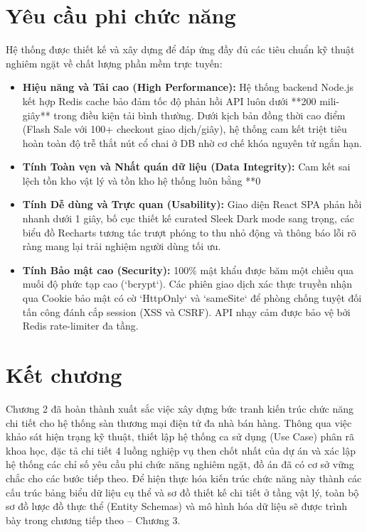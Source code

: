 \documentclass[../DoAn.tex]{subfiles}
\begin{document}
\section{Yêu cầu phi chức năng}
\label{section:2.4}
Hệ thống được thiết kế và xây dựng để đáp ứng đầy đủ các tiêu chuẩn kỹ thuật nghiêm ngặt về chất lượng phần mềm trực tuyến:
\begin{itemize}
\item \textbf{Hiệu năng và Tải cao (High Performance):} Hệ thống backend Node.js kết hợp Redis cache bảo đảm tốc độ phản hồi API luôn dưới **200 mili-giây** trong điều kiện tải bình thường. Dưới kịch bản đồng thời cao điểm (Flash Sale với 100+ checkout giao dịch/giây), hệ thống cam kết triệt tiêu hoàn toàn độ trễ thắt nút cổ chai ở DB nhờ cơ chế khóa nguyên tử ngắn hạn.
\item \textbf{Tính Toàn vẹn và Nhất quán dữ liệu (Data Integrity):} Cam kết sai lệch tồn kho vật lý và tồn kho hệ thống luôn bằng **0%
\item \textbf{Tính Dễ dùng và Trực quan (Usability):} Giao diện React SPA phản hồi nhanh dưới 1 giây, bố cục thiết kế curated Sleek Dark mode sang trọng, các biểu đồ Recharts tương tác trượt phóng to thu nhỏ động và thông báo lỗi rõ ràng mang lại trải nghiệm người dùng tối ưu.
\item \textbf{Tính Bảo mật cao (Security):} 100\% mật khẩu được băm một chiều qua muối độ phức tạp cao (`bcrypt`). Các phiên giao dịch xác thực truyền nhận qua Cookie bảo mật có cờ `HttpOnly` và `sameSite` để phòng chống tuyệt đối tấn công đánh cắp session (XSS và CSRF). API nhạy cảm được bảo vệ bởi Redis rate-limiter đa tầng.
\end{itemize}

\section*{Kết chương}
Chương 2 đã hoàn thành xuất sắc việc xây dựng bức tranh kiến trúc chức năng chi tiết cho hệ thống sàn thương mại điện tử đa nhà bán hàng. Thông qua việc khảo sát hiện trạng kỹ thuật, thiết lập hệ thống ca sử dụng (Use Case) phân rã khoa học, đặc tả chi tiết 4 luồng nghiệp vụ then chốt nhất của dự án và xác lập hệ thống các chỉ số yêu cầu phi chức năng nghiêm ngặt, đồ án đã có cơ sở vững chắc cho các bước tiếp theo. Để hiện thực hóa kiến trúc chức năng này thành các cấu trúc bảng biểu dữ liệu cụ thể và sơ đồ thiết kế chi tiết ở tầng vật lý, toàn bộ sơ đồ lược đồ thực thể (Entity Schemas) và mô hình hóa dữ liệu sẽ được trình bày trong chương tiếp theo – Chương 3.
\end{document}
